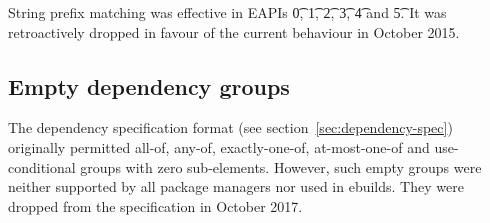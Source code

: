 String prefix matching was effective in EAPIs \t{0}, \t{1}, \t{2}, \t{3}, \t{4} and \t{5}. It was
retroactively dropped in favour of the current behaviour in October 2015.

\subsection{Empty dependency groups}
The dependency specification format (see section~\ref{sec:dependency-spec}) originally permitted
all-of, any-of, exactly-one-of, at-most-one-of and use-conditional groups with zero sub-elements.
However, such empty groups were neither supported by all package managers nor used in ebuilds.
They were dropped from the specification in October 2017.


